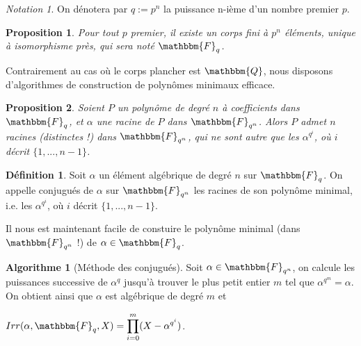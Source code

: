 \documentclass[12pt]{article}
\newcommand{\Q}{\mathbbm{Q}}
\newcommand{\Fq}{\mathbbm{F}_q}
\newcommand{\Fqn}{\mathbbm{F}_{q^n}}
\newtheorem{prop}{Proposition}
\theoremstyle{definition}\newtheorem{defn}{Définition}
\theoremstyle{definition}\newtheorem{exm}{Exemple}
\theoremstyle{definition}\newtheorem{rem}{Remarque}
\theoremstyle{definition}\newtheorem{algo}{Algorithme}
\theoremstyle{remark}\newtheorem{exo}{Exercice}
\theoremstyle{remark}\newtheorem{nota}{Notation}
\begin{document}
\begin{nota}
On dénotera par $q := p^n$ la puissance n-ième d'un nombre premier $p$.
\end{nota}

\begin{prop}
Pour tout $p$ premier, il existe un corps fini à $p^n$ éléments, unique à isomorphisme près, qui sera noté $\Fq$.
\end{prop}

Contrairement au cas où le corps plancher est $\Q$, nous disposons d'algorithmes de construction de polynômes minimaux efficace. 

\begin{prop}
Soient $P$ un polynôme de degré $n$ à coefficients dans $\Fq$, et $\alpha$ une racine de $P$ dans $\Fqn$. Alors $P$ admet $n$ racines (distinctes !) dans $\Fqn$, qui ne sont autre que les $\alpha^{q^i}$, où $i$ décrit $\{1, ..., n-1\}$.
\end{prop}

\begin{defn}
Soit $\alpha$ un élément algébrique de degré $n$ sur $\Fq$. On appelle conjugués de $\alpha$ sur $\Fqn$ les racines de son polynôme minimal, i.e. les $\alpha^{q^i}$, où $i$ décrit $\{1, ..., n-1\}$.
\end{defn}

Il nous est maintenant facile de constuire le polynôme minimal (dans $\Fqn$ !) de $\alpha \in \Fq$.

\begin{algo}[Méthode des conjugués]
Soit $\alpha \in \Fqn$, on calcule les puissances successive de $\alpha^{q}$ jusqu'à trouver le plus petit entier $m$ tel que $\alpha^{q^m} = \alpha$. On obtient ainsi que $\alpha$ est algébrique de degré $m$ et 
\begin{center} $Irr(\alpha, \Fq, X) = \displaystyle \prod_{i=0}^m (X-\alpha^{q^i})$. \end{center}
\end{algo}



\pagebreak


\end{document}
